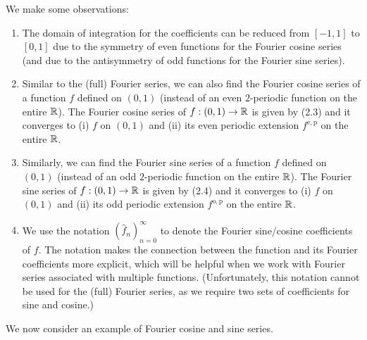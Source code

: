 We make some observations:
\begin{enumerate}
    \item The domain of integration for the coefficients can be reduced from $[-1, 1]$ to $[0, 1]$ due to the symmetry of even functions for the Fourier cosine series (and due to the antisymmetry of odd functions for the Fourier sine series).
    \item Similar to the (full) Fourier series, we can also find the Fourier cosine series of a function $f$ defined on $(0, 1)$ (instead of an even $2$-periodic function on the entire $\mathbb{R}$). The Fourier cosine series of $f : (0, 1) \to \mathbb{R}$ is given by (2.3) and it converges to (i) $f$ on $(0, 1)$ and (ii) its even periodic extension $f^{\mathrm{e,p}}$ on the entire $\mathbb{R}$.
    \item Similarly, we can find the Fourier sine series of a function $f$ defined on $(0, 1)$ (instead of an odd $2$-periodic function on the entire $\mathbb{R}$). The Fourier sine series of $f : (0, 1) \to \mathbb{R}$ is given by (2.4) and it converges to (i) $f$ on $(0, 1)$ and (ii) its odd periodic extension $f^{\mathrm{o,p}}$ on the entire $\mathbb{R}$.
    \item We use the notation $(\hat{f}_n)_{n=0}^{\infty}$ to denote the Fourier sine/cosine coefficients of $f$. The notation makes the connection between the function and its Fourier coefficients more explicit, which will be helpful when we work with Fourier series associated with multiple functions. (Unfortunately, this notation cannot be used for the (full) Fourier series, as we require two sets of coefficients for sine and cosine.)
\end{enumerate}

We now consider an example of Fourier cosine and sine series.

